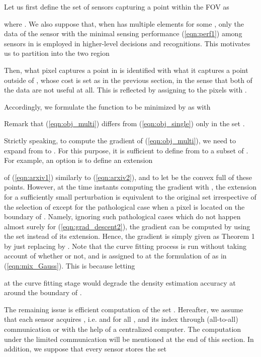 \documentclass[conference,letterpaper]{ieeeconf}
\begin{document}
Let us first define the set of sensors capturing a point  within the FOV as

where .
We also suppose that, when  has multiple elements for some ,
only the data of the sensor with the minimal 
sensing performance (\ref{eqn:perf1})
among sensors in  is employed in higher-level decisions and recognitions.
This motivates us to partition  into the two region 

Then, what pixel  captures a point in 
is identified with what it captures a point outside of ,
whose cost is set as  in the previous section,
in the sense that both of the data are not useful at all. 
This is reflected by assigning  to the pixels 
with
.


Accordingly, we formulate the  function
to be minimized by  as  with

Remark that (\ref{eqn:obj_multi}) differs from
(\ref{eqn:obj_single}) only in the set .



Strictly speaking, to compute the gradient of (\ref{eqn:obj_multi}),
we need to expand  from  to 
. 
For this purpose, it is sufficient to define 
 from  to a subset of .
For example, an option is to define 
an extension

of (\ref{eqn:arxiv1}) similarly to (\ref{eqn:arxiv2}), and
to let  be the convex full of these points.
However, at the time instants computing the gradient with ,
the extension  for a sufficiently small
perturbation  is equivalent to
the original set 
irrespective of the selection of 
except for the pathological case when a pixel is located on the boundary
of .
Namely, ignoring such pathological cases which do not happen
almost surely for (\ref{eqn:grad_descent2}),
the gradient can be computed by using 
the set  instead of its extension.
Hence, the gradient is simply given as Theorem 1
by just replacing  by .
Note that the curve fitting process is run without 
taking account of whether  or not, 
and  is assigned
to  
at the formulation of  as in (\ref{eqn:mix_Gauss}).
This is because letting

at the curve fitting stage would degrade the density estimation
accuracy at around the boundary of . 








The remaining issue is efficient computation of the set .
Hereafter, we assume that each sensor acquires ,
i.e.  and  for all ,
and its index 
through (all-to-all) communication or with the help of a centralized computer.
The computation under the limited communication will be
mentioned at the end of this section.
In addition, we suppose that every sensor stores the set
\end{document}
